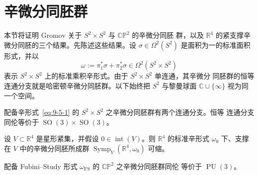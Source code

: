 
\section{辛微分同胚群}\label{sec:9-5}

本节将证明 Gromov  关于 $S^2\times S^2$ 与 $\mathbb{CP}^2$ 的辛微分同胚
群，以及 $\mathbb R^4$ 的紧支撑辛微分同胚的三个结果。先陈述这些结果。设
$\sigma\in\Omega^2(S^2)$ 是面积为一的标准面积形式，并以
\begin{equation}\label{eq:9-5-1}
  \omega:=\pi_1^*\sigma+\pi_2^*\sigma
  \in\Omega^2(S^2\times S^2)
\end{equation}
表示 $S^2\times S^2$ 上的标准乘积辛形式。由于 $S^2\times S^2$ 单连通，其辛微分
同胚群的恒等连通分支就是哈密顿辛微分同胚群。以下始终把 $S^2$ 与黎曼球面
$\mathbb C\cup\{\infty\}$ 视为同一个空间。

\begin{theorem}[Gromov]\label{thm:9-5-1}
配备辛形式~\eqref{eq:9-5-1} 的 $S^2\times S^2$ 之辛微分同胚群有两个连通分支。恒等
连通分支同伦等价于 $\operatorname{SO}(3)\times\operatorname{SO}(3)$。
\end{theorem}

\begin{theorem}[Gromov]\label{thm:9-5-2}
设 $V\subset\mathbb R^4$ 是星形紧集，并假设 $0\in\operatorname{int}(V)$。则
$\mathbb R^4$ 的标准辛形式 $\omega_0$ 下、支撑在 $V$ 中的辛微分同胚所成群
$\operatorname{Symp}_V(\mathbb R^4,\omega_0)$ 可缩。
\end{theorem}

\begin{theorem}[Gromov]\label{thm:9-5-3}
配备 Fubini--Study 形式 $\omega_{\mathrm{FS}}$ 的 $\mathbb{CP}^2$ 之辛微分同胚群同伦
等价于 $\operatorname{PU}(3)$。
\end{theorem}

